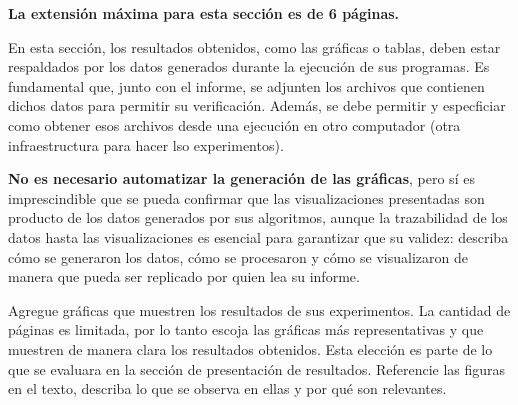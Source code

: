 \begin{mdframed}
    \textbf{La extensión máxima para esta sección es de 6 páginas.}
\end{mdframed}


En esta sección, los resultados obtenidos, como las gráficas o tablas, deben estar respaldados por los datos generados durante la ejecución de sus programas. Es fundamental que, junto con el informe, se adjunten los archivos que contienen dichos datos para permitir su verificación. Además, se debe permitir y especficiar como obtener esos archivos desde una ejecución en otro computador (otra infraestructura para hacer lso experimentos).

\textbf{No es necesario automatizar la generación de las gráficas}, pero sí es imprescindible que se pueda confirmar que las visualizaciones presentadas son producto de los datos generados por sus algoritmos, aunque la trazabilidad de los datos hasta las visualizaciones es esencial para garantizar que su validez: describa cómo se generaron los datos, cómo se procesaron y cómo se visualizaron de manera que pueda ser replicado por quien lea su informe.

Agregue gráficas que muestren los resultados de sus experimentos. La cantidad de páginas es limitada, por lo tanto escoja las gráficas más representativas y que muestren de manera clara los resultados obtenidos. Esta elección es parte de lo que se evaluara en la sección de presentación de resultados. Referencie las figuras en el texto, describa lo que se observa en ellas y por qué son relevantes.





